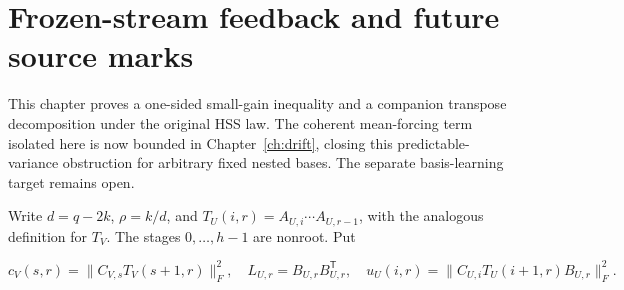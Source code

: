 \documentclass[11pt,oneside,openany,a4paper]{book}
\numberwithin{equation}{chapter}
\theoremstyle{definition}
\theoremstyle{remark}
\newcommand{\proofstep}[1]{\par\addvspace{.45\baselineskip}\Needspace{3\baselineskip}\textbf{#1}\par\nobreak}
\newcommand{\R}{\mathbb R}\newcommand{\E}{\mathbb E}\newcommand{\Prb}{\mathbb P}\newcommand{\PP}{\mathbb P}
\newcommand{\T}{\mathsf T}\newcommand{\Id}{I}
\newcommand{\F}[1]{\left\lVert#1\right\rVert_F}
\newcommand{\N}[1]{\left\lVert#1\right\rVert}
\newcommand{\op}[1]{\left\lVert#1\right\rVert_{\rm op}}
\newcommand{\ip}[2]{\left\langle#1,#2\right\rangle_F}
\DeclareMathOperator{\tr}{tr}\DeclareMathOperator{\rank}{rank}
\DeclareMathOperator{\diag}{blockdiag}\DeclareMathOperator{\range}{range}
\DeclareMathOperator{\HSS}{HSS}\DeclareMathOperator{\dist}{dist}
\DeclareMathOperator{\Var}{Var}\DeclareMathOperator{\supp}{supp}
\newcommand{\UC}{\mathcal U}\newcommand{\VC}{\mathcal V}\newcommand{\err}{\mathcal E}
\newcommand{\Sn}[2]{\left\lVert#1\right\rVert_{S_{#2}}}
\newcommand{\Cov}{\mathsf C}\newcommand{\Loss}{\mathsf L}\newcommand{\Fil}{\mathcal F}
\DeclareMathOperator{\diver}{div}\DeclareMathOperator{\vecop}{vec}\DeclareMathOperator{\Gammafun}{Gamma}
\begin{document}
\begingroup
\let\R\relax
\newcommand{\R}{\mathbb R}
\let\E\relax
\newcommand{\E}{\mathbb E}
\let\Prb\relax
\newcommand{\Prb}{\mathbb P}
\let\T\relax
\newcommand{\T}{\mathsf T}
\let\F\relax
\newcommand{\F}[1]{\left\lVert#1\right\rVert_{F}}
\let\N\relax
\newcommand{\N}[1]{\left\lVert#1\right\rVert}
\let\ip\relax
\newcommand{\ip}[2]{\left\langle#1,#2\right\rangle_F}
\let\tr\relax
\newcommand{\tr}{\operatorname{tr}}
\let\rank\relax
\newcommand{\rank}{\operatorname{rank}}
\let\diag\relax
\newcommand{\diag}{\operatorname{blockdiag}}
\let\range\relax
\newcommand{\range}{\operatorname{range}}
\let\OPT\relax
\newcommand{\OPT}{\operatorname{OPT}}
\let\HSS\relax
\newcommand{\HSS}{\operatorname{HSS}}
\let\diver\relax
\newcommand{\diver}{\operatorname{div}}
\let\Var\relax
\newcommand{\Var}{\operatorname{Var}}
\let\UC\relax
\newcommand{\UC}{\mathcal U}
\let\VC\relax
\newcommand{\VC}{\mathcal V}
\let\err\relax
\newcommand{\err}{\mathcal E}
\let\proofstep\relax
\newcommand{\proofstep}[1]{\par\addvspace{.45\baselineskip}\Needspace{3\baselineskip}\textbf{#1}\par\nobreak}
\let\op\relax
\newcommand{\op}[1]{\left\lVert#1\right\rVert_{\mathrm{op}}}
\let\Sn\relax
\newcommand{\Sn}[2]{\left\lVert#1\right\rVert_{S_{#2}}}
\let\Cov\relax
\newcommand{\Cov}{\mathsf C}
\let\Loss\relax
\newcommand{\Loss}{\mathsf L}
\let\Fil\relax
\newcommand{\Fil}{\mathcal F}
\let\Id\relax
\newcommand{\Id}{I}
\let\supp\relax
\newcommand{\supp}{\operatorname{supp}}
\let\vecop\relax
\newcommand{\vecop}{\operatorname{vec}}
\let\Gammafun\relax
\newcommand{\Gammafun}{\operatorname{Gamma}}
\chapter{Frozen-stream feedback and future source marks}\label{ch:feedback}
This chapter proves a one-sided small-gain inequality and a companion transpose decomposition under the original HSS law. The coherent mean-forcing term isolated here is now bounded in Chapter~\ref{ch:drift}, closing this predictable-variance obstruction for arbitrary fixed nested bases. The separate basis-learning target remains open.

Write \(d=q-2k\), \(\rho=k/d\), and \(T_U(i,r)=A_{U,i}\cdots A_{U,r-1}\), with the analogous definition for \(T_V\). The stages \(0,\ldots,h-1\) are nonroot. Put

\[
c_V(s,r)=\|C_{V,s}T_V(s+1,r)\|_F^2,
\quad L_{U,r}=B_{U,r}B_{U,r}^{\mathsf T},
\quad u_U(i,r)=\|C_{U,i}T_U(i+1,r)B_{U,r}\|_F^2.
\]
\end{document}
